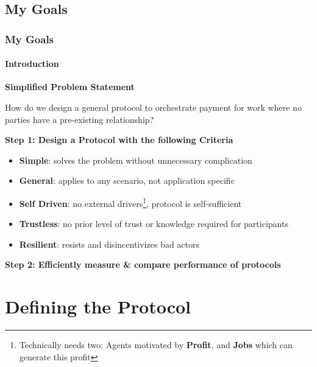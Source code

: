 \documentclass[
	10pt, %
	aspectratio=169, %
]{beamer}
\begin{document}
\subsection{My Goals}
\begin{frame}
	\frametitle{My Goals}
	\framesubtitle{Introduction}

	{
		\large \bf
		Simplified Problem Statement
	}

	\smallskip

	How do we design a general protocol to orchestrate payment for work where no parties have a pre-existing relationship?

	\medskip	

	{
		\large \bf
		Step 1: Design a Protocol with the following Criteria
	}
	\begin{itemize}
		\item \textbf{Simple}: solves the problem without unnecessary complication
		\item \textbf{General}: applies to any scenario, not application specific
		\item \textbf{Self Driven}: no external drivers\footnote{Technically needs two: Agents motivated by \textbf{Profit}, and \textbf{Jobs} which can generate this profit}, protocol is self-sufficient
		\item \textbf{Trustless}: no prior level of trust or knowledge required for participants
		\item \textbf{Resilient}: resists and disincentivizes bad actors
	\end{itemize}

	\medskip

	{
		\large \bf
		Step 2: Efficiently measure \& compare performance of protocols
	}
\end{frame}

\section{Defining the Protocol}
\frame{\sectionpage}
\end{document}
